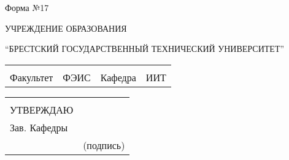 \documentclass[12pt, А4]{article} %
\begin{document}

    \begin{FlushRight} %
    \fontsize{11}{13.75} \textsf{Форма №17} 
    \end{FlushRight} %

\fontsize{14}{17.5} %


    \begin{Center} %

    \textrm{УЧРЕЖДЕНИЕ ОБРАЗОВАНИЯ}
    \par %
    \textrm{“БРЕСТСКИЙ ГОСУДАРСТВЕННЫЙ ТЕХНИЧЕСКИЙ УНИВЕРСИТЕТ”}

    \end{Center}  %

\fontsize{12}{15} %

    \begin{FlushLeft} %

    \begin{tabular}{p{2.2cm} p{5.8cm} p{2.2cm} p{5.75cm}} %
        & & %
        \\ %
        \textsf{Факультет} & 
        \centering \textsf{ФЭИС} \vspace{1pt} \hline &
        \textsf{Кафедра} &
        \centering \textsf{ИИТ} \vspace{1pt} \hline 
    \end{tabular} %

    \begin{tabular}{p{2.8cm} p{5.25cm}} %
        & %
        \\ %
        \textsf{УТВЕРЖДАЮ} & 
        \\ %
        \textsf{Зав. Кафедры} &
        \vspace{1pt} \hline 
        \\ %
        \hspace{2.8cm} &  \centering \textsf{(подпись)}
    \end{tabular} %

    \end{FlushLeft} %
\end{document}
